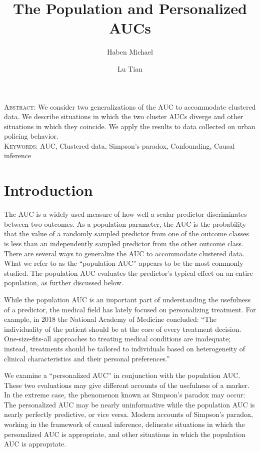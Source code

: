 \documentclass[12pt]{article}
\title{The Population and Personalized AUCs}
\author[1]{Haben Michael}
\author[2]{Lu Tian}
\affil[1]{University of Massachusetts}
\affil[2]{Stanford University}
\date{}
\begin{document}
\maketitle
\noindent\textsc{Abstract:} We consider two generalizations of the AUC to accommodate
clustered data. We describe situations in which the two cluster AUCs
diverge and other situations in which they coincide. We apply the
results to data collected on urban policing behavior.\\
\textsc{Keywords:} AUC, Clustered data, Simpson's paradox,  Confounding, Causal inference

\section{Introduction}
The AUC is a widely used measure of how well a scalar predictor
discriminates between two outcomes. As a population parameter, the AUC
is the probability that the value of a randomly sampled predictor from
one of the outcome classes is less than an independently sampled
predictor from the other outcome class. There are several ways to
generalize the AUC to accommodate clustered data. What we refer to as
the ``population AUC'' appears to be the most commonly studied. The
population AUC evaluates the predictor's typical effect on an entire
population, as further discussed below.

While the population AUC is an important part of understanding the
usefulness of a predictor, the medical field has lately focused on
personalizing treatment. %
For example, in 2018 the National Academy of Medicine concluded: ``The
individuality of the patient should be at the core of every treatment
decision. One-size-fits-all approaches to treating medical conditions
are inadequate; instead, treatments should be tailored to individuals
based on heterogeneity of clinical characteristics and their personal
preferences.''

We examine a ``personalized AUC'' in conjunction with the population
AUC.  These two evaluations may give different accounts of the
usefulness of a marker. In the extreme case, the phenomenon known as
Simpson's paradox may occur: The personalized AUC may be nearly
uninformative while the population AUC is nearly perfectly
predictive, or vice versa. Modern accounts of Simpson's paradox,
working in the framework of causal inference, delineate situations in
which the personalized AUC is appropriate, and other situations in which
the population AUC is appropriate.
\end{document}

